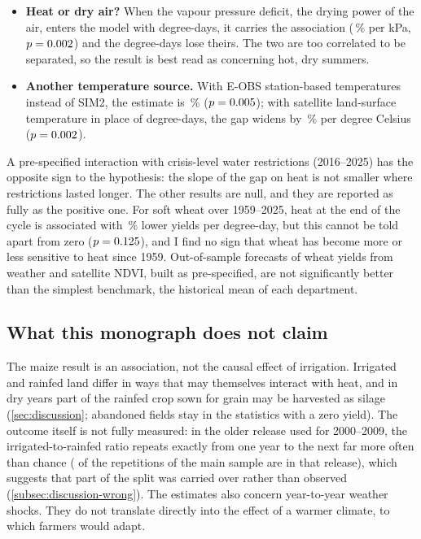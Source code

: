 \begin{itemize}
  \item \textbf{Heat or dry air?} When the vapour pressure deficit, the drying power of the air, enters the model with degree-days, it carries the association (\VpdJointPct\,\% per kPa, $p = 0.002$) and the degree-days lose theirs. The two are too correlated to be separated, so the result is best read as concerning hot, dry summers.
  \item \textbf{Another temperature source.} With E-OBS station-based temperatures instead of SIM2, the estimate is \EobsPct\,\% ($p = 0.005$); with satellite land-surface temperature in place of degree-days, the gap widens by \LstPct\,\% per degree Celsius ($p = 0.002$).
\end{itemize}

A pre-specified interaction with crisis-level water restrictions (2016--2025) has the opposite sign to the hypothesis: the slope of the gap on heat is not smaller where restrictions lasted longer. The other results are null, and they are reported as fully as the positive one. For soft wheat over 1959--2025, heat at the end of the cycle is associated with \QtwoPct\,\% lower yields per degree-day, but this cannot be told apart from zero ($p = 0.125$), and I find no sign that wheat has become more or less sensitive to heat since 1959. Out-of-sample forecasts of wheat yields from weather and satellite NDVI, built as pre-specified, are not significantly better than the simplest benchmark, the historical mean of each department.

\subsection*{What this monograph does not claim}

The maize result is an association, not the causal effect of irrigation. Irrigated and rainfed land differ in ways that may themselves interact with heat, and in dry years part of the rainfed crop sown for grain may be harvested as silage (\cref{sec:discussion}; abandoned fields stay in the statistics with a zero yield). The outcome itself is not fully measured: in the older release used for 2000--2009, the irrigated-to-rainfed ratio repeats exactly from one year to the next far more often than chance (\SaaRepOld{} of the \SaaRepTot{} repetitions of the main sample are in that release), which suggests that part of the split was carried over rather than observed (\cref{subsec:discussion-wrong}). The estimates also concern year-to-year weather shocks. They do not translate directly into the effect of a warmer climate, to which farmers would adapt.

